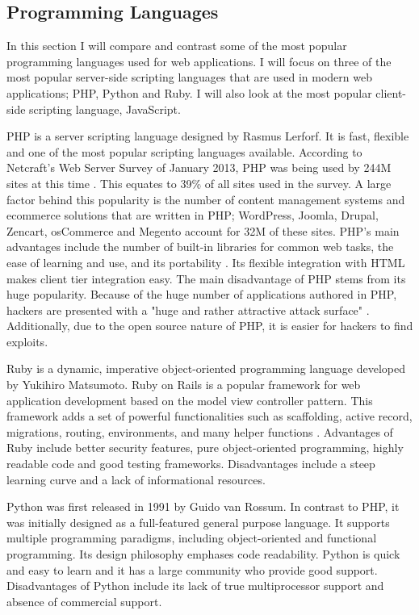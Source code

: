 \documentclass[authoryearcitations]{UoYCSproject}
\begin{document}
\subsection{Programming Languages}

In this section I will compare and contrast some of the most popular programming languages used for web applications. I will focus on three of the most popular server-side scripting languages that are used in modern web applications; PHP, Python and Ruby. I will also look at the most popular client-side scripting language, JavaScript.

PHP is a server scripting language designed by Rasmus Lerforf. It is fast, flexible and one of the most popular scripting languages available. According to Netcraft's Web Server Survey of January 2013, PHP was being used by 244M sites at this time \citep{Ide2013}. This equates to 39\% of all sites used in the survey. A large factor behind this popularity is the number of content management systems and ecommerce solutions that are written in PHP; WordPress, Joomla, Drupal, Zencart, osCommerce and Megento account for 32M of these sites. PHP's main advantages include the number of built-in libraries for common web tasks, the ease of learning and use, and its portability \citep{Welling2005}. Its flexible integration with HTML makes client tier integration easy. The main disadvantage of PHP stems from its huge popularity. Because of the huge number of applications authored in PHP, hackers are presented with a "huge and rather attractive attack surface" \citep{Ide2013}. Additionally, due to the open source nature of PHP, it is easier for hackers to find exploits. 

Ruby is a dynamic, imperative object-oriented programming language developed by Yukihiro Matsumoto. Ruby on Rails is a popular framework for web application development based on the model view controller pattern. This framework adds a set of powerful functionalities such as scaffolding, active record, migrations, routing, environments, and many helper functions \citep{Jazayeri2007}. Advantages of Ruby include better security features, pure object-oriented programming, highly readable code and good testing frameworks. Disadvantages include a steep learning curve and a lack of informational resources.

Python was first released in 1991 by Guido van Rossum. In contrast to PHP, it was initially designed as a full-featured general purpose language. It supports multiple programming paradigms, including object-oriented and functional programming. Its design philosophy emphases code readability. Python is quick and easy to learn and it has a large community who provide good support. Disadvantages of Python include its lack of true multiprocessor support and absence of commercial support. 
\end{document}
